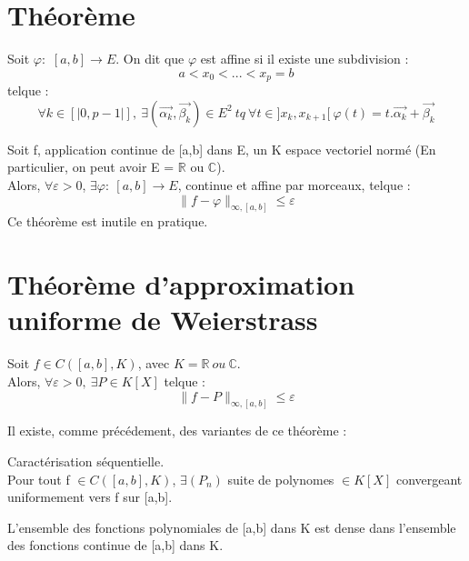 \section{Théorème}
\begin{de}
Soit $\varphi :$ $[a,b] \rightarrow E$. On dit que $\varphi$ est affine si il existe une subdivision :
$$a < x_0 < ... < x_p=b$$
telque : 
$$\forall k \in [|0,p-1|],~ \exists (\overrightarrow{\alpha_k},\overrightarrow{\beta_k}) \in E^2~ tq~ \forall t \in ]x_k,x_{k+1}[~ \varphi(t) = t.\overrightarrow{\alpha_k}+ \overrightarrow{\beta_k}$$
\end{de}
\begin{theo}
Soit f, application continue de [a,b] dans E, un K espace vectoriel normé (En particulier, on peut avoir E = $\mathbb{R}$ ou $\mathbb{C}$).\\
Alors, $\forall \varepsilon > 0$, $\exists \varphi:~ [a,b] \rightarrow E$, continue et affine par morceaux, telque :
$$\parallel f - \varphi \parallel_{\infty,[a,b]} \leq \varepsilon$$
Ce théorème est inutile en pratique.
\end{theo}
\section{Théorème d'approximation uniforme de Weierstrass}
\begin{theo}
Soit $f \in C([a,b],K)$, avec $K=\mathbb{R}~ ou~ \mathbb{C}$.\\
Alors, $\forall \varepsilon > 0,~ \exists P \in K[X]$ telque : 
$$\parallel f- P \parallel_{\infty,[a,b]} \leq \varepsilon$$ 
\end{theo}
Il existe, comme précédement, des variantes de ce théorème : 
\begin{theo}
Caractérisation séquentielle.\\
Pour tout f $\in C([a,b],K)$, $\exists (P_n)$ suite de polynomes $\in K[X]$ convergeant uniformement vers f sur [a,b].
\end{theo}
\begin{theo}
L'ensemble des fonctions polynomiales de [a,b] dans K est dense dans l'ensemble des fonctions continue de [a,b] dans K.
\end{theo}

